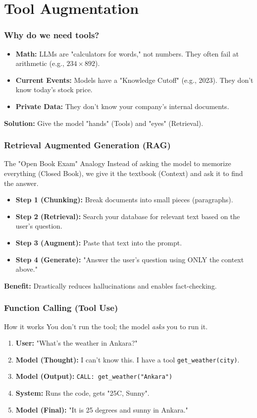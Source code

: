 \documentclass{beamer}
\begin{document}
\section{Tool Augmentation}

\begin{frame}
    \frametitle{Why do we need tools?}
    \begin{itemize}
        \item \textbf{Math:} LLMs are "calculators for words," not numbers. They often fail at arithmetic (e.g., $234 \times 892$).
        \item \textbf{Current Events:} Models have a "Knowledge Cutoff" (e.g., 2023). They don't know today's stock price.
        \item \textbf{Private Data:} They don't know your company's internal documents.
    \end{itemize}
    \textbf{Solution:} Give the model "hands" (Tools) and "eyes" (Retrieval).
\end{frame}

\begin{frame}
    \frametitle{Retrieval Augmented Generation (RAG)}
    \begin{block}{The "Open Book Exam" Analogy}
        Instead of asking the model to memorize everything (Closed Book), we give it the textbook (Context) and ask it to find the answer.
    \end{block}
    \begin{itemize}
        \item \textbf{Step 1 (Chunking):} Break documents into small pieces (paragraphs).
        \item \textbf{Step 2 (Retrieval):} Search your database for relevant text based on the user's question.
        \item \textbf{Step 3 (Augment):} Paste that text into the prompt.
        \item \textbf{Step 4 (Generate):} "Answer the user's question using ONLY the context above."
    \end{itemize}
    \textbf{Benefit:} Drastically reduces hallucinations and enables fact-checking.
\end{frame}

\begin{frame}
    \frametitle{Function Calling (Tool Use)}
    \begin{block}{How it works}
        You don't run the tool; the model \textit{asks} you to run it.
    \end{block}
    \begin{enumerate}
        \item \textbf{User:} "What's the weather in Ankara?"
        \item \textbf{Model (Thought):} I can't know this. I have a tool \texttt{get\_weather(city)}.
        \item \textbf{Model (Output):} \texttt{CALL: get\_weather("Ankara")}
        \item \textbf{System:} Runs the code, gets "25C, Sunny".
        \item \textbf{Model (Final):} "It is 25 degrees and sunny in Ankara."
    \end{enumerate}
\end{frame}
\end{document}
